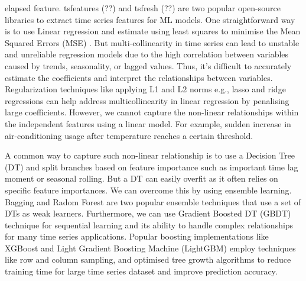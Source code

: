\documentclass[mstat,12pt]{unswthesis}
\begin{document}
elapsed feature. tsfeatures (??) and tsfresh (??) are two popular
open-source libraries to extract time series features for ML models. One
straightforward way is to use Linear regression and estimate using least
squares to minimise the Mean Squared Errors (MSE)
\cite{lai2005forecasting}. But multi-collinearity in time series can
lead to unstable and unreliable regression models due to the high
correlation between variables caused by trends, seasonality, or lagged
values. Thus, it's difficult to accurately estimate the coefficients and
interpret the relationships between variables. Regularization techniques
like applying L1 and L2 norms e.g., lasso and ridge regressions can help
address multicollinearity in linear regression by penalising large
coefficients. However, we cannot capture the non-linear relationships
within the independent features using a linear model. For example,
sudden increase in air-conditioning usage after temperature reaches a
certain threshold.

A common way to capture such non-linear relationship is to use a
Decision Tree (DT) \cite{Spiliotis2022} and split branches based on
feature importance such as important time lag moment or seasonal
rolling. But a DT can easily overfit as it often relies on specific
feature importances. We can overcome this by using ensemble learning.
Bagging and Radom Forest are two popular ensemble techniques that use a
set of DTs as weak learners. Furthermore, we can use Gradient Boosted DT
(GBDT) technique for sequential learning and its ability to handle
complex relationships for many time series applications. Popular
boosting implementations like XGBoost \cite{chen2020novel} and Light
Gradient Boosting Machine (LightGBM) \cite{salinas2017deepar} employ
techniques like row and column sampling, and optimised tree growth
algorithms to reduce training time for large time series dataset and
improve prediction accuracy.
\end{document}
